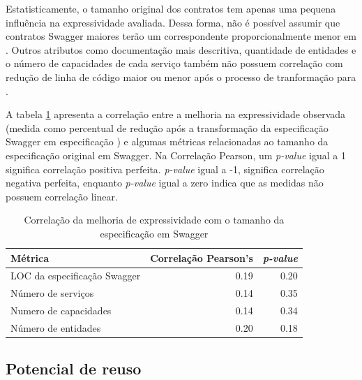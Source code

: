 Estatisticamente, o tamanho original dos contratos tem apenas uma pequena
influência na expressividade avaliada. Dessa forma, não é possível assumir que
contratos Swagger maiores terão um correspondente proporcionalmente menor em
\neoidl{}.
Outros atributos como documentação mais descritiva, quantidade de entidades e o
número de capacidades de cada serviço também não possuem correlação com redução
de linha de código maior ou menor após o processo de tranformação para
\neoidl{}.

A tabela \ref{tab:size-corr} apresenta a correlação entre a
melhoria na expressividade observada (medida como percentual de redução após a
transformação da especificação Swagger em especificação \neoidl{}) e algumas
métricas relacionadas ao tamanho da especificação original em Swagger. Na
Correlação Pearson, um \emph{p-value} igual a 1 significa correlação
positiva perfeita. \emph{p-value} igual a -1, significa correlação negativa
perfeita, enquanto \emph{p-value} igual a zero indica que as medidas não possuem
correlação linear.

% 
% 

\begin{table}[htb]
\caption{Correlação da melhoria de expressividade com o tamanho da especificação
em Swagger}
\begin{center}
\begin{tabular}{lrr} 
\toprule
Métrica & Correlação Pearson's & \emph{p-value} \\ \hline \hline 
LOC da especificação Swagger & 0.19 &  0.20 \\ 
Número de serviços & 0.14 & 0.35 \\ 
Numero de capacidades & 0.14 & 0.34 \\
Número de entidades & 0.20 & 0.18 \\ \bottomrule 
\end{tabular} 
\end{center}
\label{tab:size-corr}
\end{table}





\subsection{Potencial de reuso}

